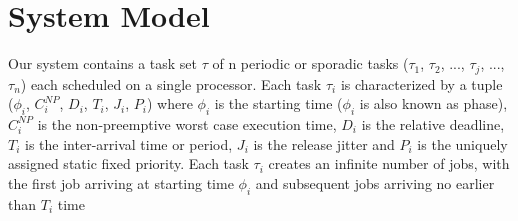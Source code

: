 \section{System Model}\label{sec:system_model}

Our system contains a task set \begin{math}\tau\end{math} of n periodic or sporadic tasks (\begin{math}\tau_{1}\end{math}, \begin{math}\tau_{2}\end{math}, ..., \begin{math}\tau_{j}\end{math}, ..., \begin{math}\tau_{n}\end{math}) each scheduled on a single processor.  Each task \begin{math}\tau_{i}\end{math} is characterized by a tuple (\begin{math}\phi_{i}\end{math}, \begin{math}C_{i}^{NP}\end{math}, \begin{math}D_{i}\end{math}, \begin{math}T_{i}\end{math}, \begin{math}J_{i}\end{math}, \begin{math}P_{i}\end{math}) where \begin{math}\phi_{i}\end{math} is the starting time (\begin{math}\phi_{i}\end{math} is also known as phase), \begin{math}C_{i}^{NP}\end{math} is the non-preemptive worst case execution time, \begin{math}D_{i}\end{math} is the relative deadline, \begin{math}T_{i}\end{math} is the inter-arrival time or period, \begin{math}J_{i}\end{math} is the release jitter and \begin{math}P_{i}\end{math} is the uniquely assigned static fixed priority.  Each task \begin{math}\tau_{i}\end{math} creates an infinite number of jobs, with the first job arriving at starting time \begin{math}\phi_{i}\end{math} and subsequent jobs arriving no earlier than \begin{math}T_{i}\end{math} time 